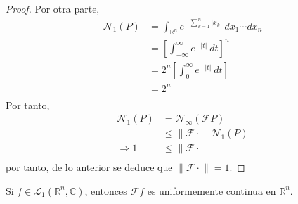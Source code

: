 \documentclass[12pt]{report}
\newcounter{it}
\theoremstyle{largebreak}
\renewcommand{\leq}{\ensuremath{\leqslant}}
\newcommand\abs[1]{\ensuremath{\left|#1\right|}}
\newcommand\norm[1]{\ensuremath{\|#1\|}}
\newcommand{\N}[2]{\ensuremath{\mathcal{N}_{#1}\left(#2\right)}}
\newcommand{\fou}[1]{\ensuremath{\mathcal{F}#1}}
\begin{document}
\begin{proof}
        Por otra parte,
        \begin{equation*}
            \begin{split}
                \N{1}{P}&=\int_{\mathbb{R}^n}e^{ -\sum_{ k=1}^n\abs{x_k}}\:dx_1\cdots dx_n\\
                &=\left[\int_{-\infty}^\infty e^{-\abs{t}}\:dt \right]^n\\
                &=2^n\left[\int_0^{\infty}e^{-\abs{t}}\:dt \right]\\
                &=2^n\\
            \end{split}
        \end{equation*}
        Por tanto,
        \begin{equation*}
            \begin{split}
                \N{1}{P}&=\N{\infty}{\fou{P}}\\
                &\leq\norm{\fou{\cdot}}\N{1}{P}\\
                \Rightarrow 1&\leq\norm{\fou{\cdot}}\\
            \end{split}
        \end{equation*}
        por tanto, de lo anterior se deduce que $\norm{\fou{\cdot}}=1$. 
    \end{proof}

    \begin{propo}
        Si $f\in\mathcal{L}_1(\mathbb{R}^n,\mathbb{C})$, entonces $\fou{f}$ es uniformemente continua en $\mathbb{R}^n$.
    \end{propo}
\end{document}
